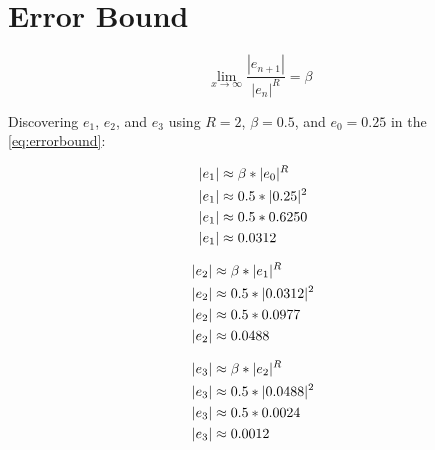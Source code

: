 \section{Error Bound}

	\begin{equation}
		\lim_{x\to\infty} \frac{|e_{n+1}|}{|e_{n}|^{R}} = \beta
	\label{eq:errorbound}
	\end{equation}

	Discovering $e_{1}$, $e_{2}$, and $e_{3}$ using $R = 2$, $\beta = 0.5$, and $e_{0} = 0.25$ in the \cref{eq:errorbound}:

	\begin{align}
		|e_{1}| &\approx \beta*|e_{0}|^{R}& \notag \\
		|e_{1}| &\approx 0.5*|0.25|^{2}& \notag \\
		|e_{1}| &\approx 0.5*0.6250& \notag \\
		|e_{1}| &\approx 0.0312&
	\label{eq:351e}
	\end{align}

	\begin{align}
		|e_{2}| &\approx \beta*|e_{1}|^{R}& \notag \\
		|e_{2}| &\approx 0.5*|0.0312|^{2}& \notag \\
		|e_{2}| &\approx 0.5*0.0977& \notag \\
		|e_{2}| &\approx 0.0488&
	\label{eq:352e}
	\end{align}

	\begin{align}
		|e_{3}| &\approx \beta*|e_{2}|^{R}& \notag \\
		|e_{3}| &\approx 0.5*|0.0488|^{2}& \notag \\
		|e_{3}| &\approx 0.5*0.0024 \notag \\
		|e_{3}| &\approx 0.0012&
	\label{eq:353e}
	\end{align}